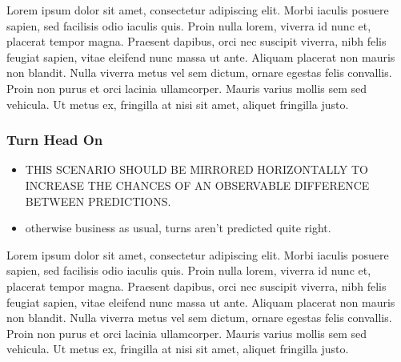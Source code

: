 Lorem ipsum dolor sit amet, consectetur adipiscing elit. Morbi iaculis posuere sapien, sed facilisis odio iaculis quis. 
Proin nulla lorem, viverra id nunc et, placerat tempor magna. Praesent dapibus, orci nec suscipit viverra, nibh felis feugiat sapien, 
vitae eleifend nunc massa ut ante. Aliquam placerat non mauris non blandit. Nulla viverra metus vel sem dictum, ornare egestas felis convallis. 
Proin non purus et orci lacinia ullamcorper. Mauris varius mollis sem sed vehicula. Ut metus ex, fringilla at nisi sit amet, aliquet fringilla justo.


\subsubsection{Turn Head On}
\begin{itemize}
    \item THIS SCENARIO SHOULD BE MIRRORED HORIZONTALLY TO INCREASE THE CHANCES OF AN OBSERVABLE DIFFERENCE BETWEEN PREDICTIONS.
    \item otherwise business as usual, turns aren't predicted quite right.
\end{itemize}
Lorem ipsum dolor sit amet, consectetur adipiscing elit. Morbi iaculis posuere sapien, sed facilisis odio iaculis quis. 
Proin nulla lorem, viverra id nunc et, placerat tempor magna. Praesent dapibus, orci nec suscipit viverra, nibh felis feugiat sapien, 
vitae eleifend nunc massa ut ante. Aliquam placerat non mauris non blandit. Nulla viverra metus vel sem dictum, ornare egestas felis convallis. 
Proin non purus et orci lacinia ullamcorper. Mauris varius mollis sem sed vehicula. Ut metus ex, fringilla at nisi sit amet, aliquet fringilla justo.
